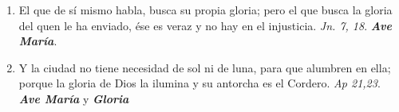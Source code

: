 \documentclass[../../devocionario.tex]{subfiles}
\begin{document}
\begin{enumerate}
        \item El que de sí mismo habla, busca su propia gloria; pero el que busca la gloria del quen le ha enviado, ése es veraz y no hay en el injusticia.
             \emph{Jn. 7, 18}. \textbf{\emph{Ave María}}.

        \item Y la ciudad no tiene necesidad de sol ni de luna, para que alumbren en ella; porque la gloria de Dios la ilumina y su antorcha es el Cordero. 
            \emph{Ap 21,23}. \textbf{\emph{Ave María}} y \textbf{\emph{Gloria}}
    
    \end{enumerate}
\end{document}
